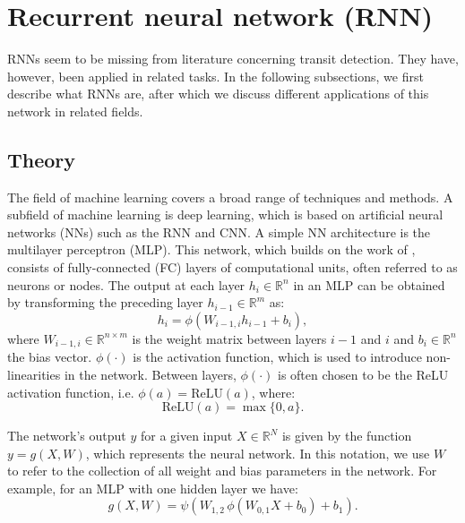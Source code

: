 
\section{Recurrent neural network (RNN)}
\label{sec:rnn}

RNNs seem to be missing from literature concerning transit detection. They have, however, been applied in related tasks. In the following subsections, we first describe what RNNs are, after which we discuss different applications of this network in related fields.

\subsection{Theory}

\noindent The field of machine learning covers a broad range of techniques and methods. A subfield of machine learning is deep learning, which is based on artificial neural networks (NNs) such as the RNN and CNN. A simple NN architecture is the multilayer perceptron (MLP). This network, which builds on the work of \cite{rosenblatt1958perceptron}, consists of fully-connected (FC) layers of computational units, often referred to as neurons or nodes. The output at each layer $h_{i} \in \mathbb{R}^{n}$ in an MLP can be obtained by transforming the preceding layer $h_{i-1} \in \mathbb{R}^{m}$ as:
\begin{equation}
    h_{i} = \phi(W_{i-1,i} h_{i-1} + b_{i}),
\end{equation}
where $W_{i-1,i} \in \mathbb{R}^{n \times m}$ is the weight matrix between layers $i-1$ and $i$ and $b_{i} \in \mathbb{R}^n$ the bias vector. $\phi(\cdot)$ is the activation function, which is used to introduce non-linearities in the network. Between layers, $\phi(\cdot)$ is often chosen to be the ReLU activation function, i.e. $\phi(a) = \text{ReLU}(a)$, where:
\begin{equation}
    \text{ReLU}(a) = \max \{0, a\}.
\end{equation}

The network's output $y$ for a given input $X \in \mathbb{R}^N$ is given by the function $y = g(X, W)$, which represents the neural network. In this notation, we use $W$ to refer to the collection of all weight and bias parameters in the network. For example, for an MLP with one hidden layer we have:
\begin{equation}
    \label{eq:mlp_function}
    g(X, W) = \psi(W_{1,2}\, \phi(W_{0,1} X + b_{0}) + b_{1}).
\end{equation}

